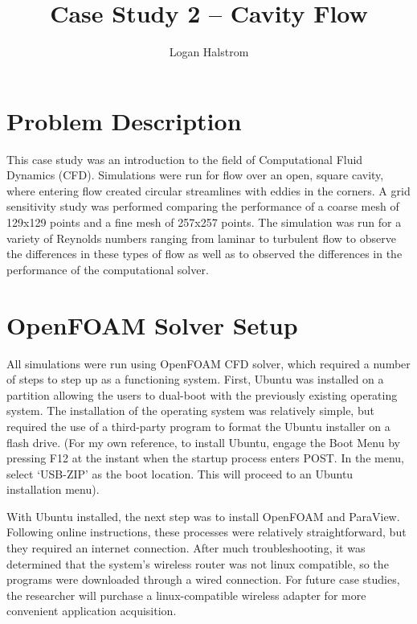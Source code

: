 \documentclass[twocolumn,10pt]{asme2ej}
\title{Case Study 2 -- Cavity Flow}
\author{Logan Halstrom
    \affiliation{
	PhD Graduate Student Researcher\\
	Center for Human/Robot/Vehicle Integration and Performance\\
	Department of Mechanical and Aerospace Engineering\\
	University of California, Davis\\
	Davis, California 95616\\
    Email: ldhalstrom@ucdavis.edu
    }
}
\begin{document}
\maketitle

\section{Problem Description}

This case study was an introduction to the field of Computational Fluid Dynamics (CFD).  Simulations were run for flow over an open, square cavity, where entering flow created circular streamlines with eddies in the corners.  A grid sensitivity study was performed comparing the performance of a coarse mesh of 129x129 points and a fine mesh of 257x257 points.  The simulation was run for a variety of Reynolds numbers ranging from laminar to turbulent flow to observe the differences in these types of flow as well as to observed the differences in the performance of the computational solver.  

\section{OpenFOAM Solver Setup}

All simulations were run using OpenFOAM CFD solver, which required a number of steps to step up as a functioning system.  First, Ubuntu was installed on a partition allowing the users to dual-boot with the previously existing operating system.  The installation of the operating system was relatively simple, but required the use of a third-party program to format the Ubuntu installer on a flash drive.  (For my own reference, to install Ubuntu, engage the Boot Menu by pressing F12 at the instant when the startup process enters POST.  In the menu, select ‘USB-ZIP’ as the boot location.  This will proceed to an Ubuntu installation menu).

With Ubuntu installed, the next step was to install OpenFOAM and ParaView.  Following online instructions, these processes were relatively straightforward, but they required an internet connection.  After much troubleshooting, it was determined that the system’s wireless router was not linux compatible, so the programs were downloaded through a wired connection.  For future case studies, the researcher will purchase a linux-compatible wireless adapter for more convenient application acquisition.  
\end{document}
